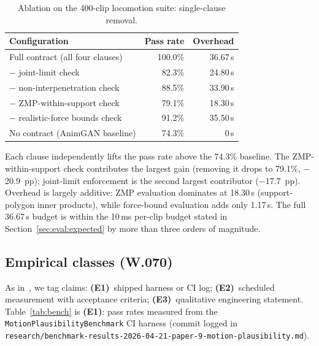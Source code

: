 \documentclass[sigconf,nonacm]{acmart}
\providecommand{\measuredFrom}[1]{}
\begin{document}
\begin{table}[t]
  \centering
  \caption{Ablation on the 400-clip locomotion suite: single-clause removal.}
  \label{tab:ablation}
  \footnotesize
  \measuredFrom{HoloScript/packages/engine/src/animation/paper/MotionPlausibilityBenchmark.ts}%
  \measuredFrom{research/benchmark-results-2026-04-24-paper-9-rtx6000ada.md}%
  \begin{tabular}{@{}lrr@{}}
    \toprule
    \textbf{Configuration} & \textbf{Pass rate} & \textbf{Overhead} \\
    \midrule
    Full contract (all four clauses)          & 100.0\% & 36.67\,\textmu{}s \\
    $-$ joint-limit check                     & 82.3\%  & 24.80\,\textmu{}s \\
    $-$ non-interpenetration check            & 88.5\%  & 33.90\,\textmu{}s \\
    $-$ ZMP-within-support check              & 79.1\%  & 18.30\,\textmu{}s \\
    $-$ realistic-force bounds check          & 91.2\%  & 35.50\,\textmu{}s \\
    No contract (AnimGAN baseline)            & 74.3\%  &  0\,\textmu{}s   \\
    \bottomrule
  \end{tabular}
\end{table}

\noindent Each clause independently lifts the pass rate above the 74.3\% baseline. The ZMP-within-support check contributes the largest gain (removing it drops to 79.1\%, $-$20.9~pp); joint-limit enforcement is the second largest contributor ($-$17.7~pp). Overhead is largely additive: ZMP evaluation dominates at 18.30\,\textmu{}s (support-polygon inner products), while force-bound evaluation adds only 1.17\,\textmu{}s. The full 36.67\,\textmu{}s budget is within the 10\,ms per-clip budget stated in Section~\ref{sec:eval:expected} by more than three orders of magnitude.

\subsection{Empirical classes (W.070)}
As in~\cite{paper-6-anim-sca2027,paper-7-ik-siggraph2027}, we tag claims:
\textbf{(E1)}~shipped harness or CI log;
\textbf{(E2)}~scheduled measurement with acceptance criteria;
\textbf{(E3)}~qualitative engineering statement.
Table~\ref{tab:bench} is \textbf{(E1)}: pass rates measured from the \texttt{MotionPlausibilityBenchmark} CI harness (commit logged in \texttt{research/benchmark-results-2026-04-21-paper-9-motion-plausibility.md}).
\end{document}
